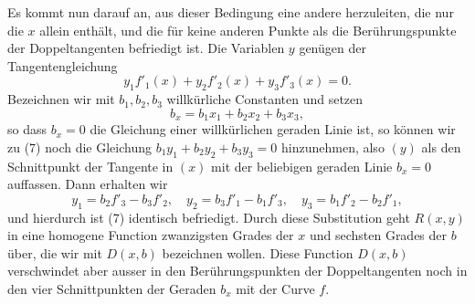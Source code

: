 \documentclass[11pt]{article}
\begin{document}
Es kommt nun darauf an, aus dieser Bedingung eine andere herzuleiten, die nur die \(x\) allein enthält, und die für keine anderen Punkte als die Berührungspunkte der Doppeltangenten befriedigt ist. Die Variablen \(y\) genügen der Tangentengleichung
\begin{equation}
 y_1f'_1(x)+y_2f'_2(x)+y_3f'_3(x)=0.
 \tag{7}
\end{equation}
Bezeichnen wir mit \(b_1,b_2,b_3\) willkürliche Constanten und setzen
\begin{equation}
 b_x=b_1x_1+b_2x_2+b_3x_3,
 \tag{8}
\end{equation}
so dass \(b_x=0\) die Gleichung einer willkürlichen geraden Linie ist, so können wir zu (7) noch die Gleichung \(b_1y_1+b_2y_2+b_3y_3=0\) hinzunehmen, also \((y)\) als den Schnittpunkt der Tangente in \((x)\) mit der beliebigen geraden Linie \(b_x=0\) auffassen. Dann erhalten wir
\begin{equation}
 y_1=b_2f'_3-b_3f'_2,
 \quad y_2=b_3f'_1-b_1f'_3,
 \quad y_3=b_1f'_2-b_2f'_1,
 \tag{10}
\end{equation}
und hierdurch ist (7) identisch befriedigt. Durch diese Substitution geht \(R(x,y)\) in eine homogene Function zwanzigsten Grades der \(x\) und sechsten Grades der \(b\) über, die wir mit \(D(x,b)\) bezeichnen wollen. Diese Function \(D(x,b)\) verschwindet aber ausser in den Berührungspunkten der Doppeltangenten noch in den vier Schnittpunkten der Geraden \(b_x\) mit der Curve \(f\).
\end{document}
